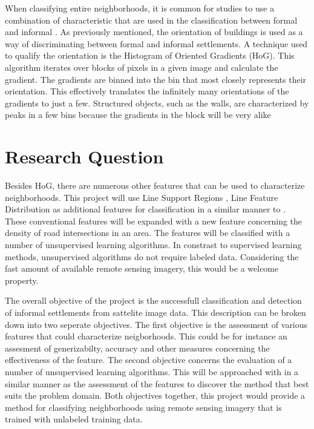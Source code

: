 \documentclass{article}
\begin{document}

When classifying entire neighborhoods, it is common for studies to use a combination
of characteristic that are used in the classification between formal and
informal \cite{graesser2012image}. As previously mentioned, the orientation of
buildings is used as a way of discriminating between formal and informal
settlements. A technique used to qualify the orientation is the Histogram of
Oriented Gradients (HoG)\cite{kumar2006discriminative}. This algorithm iterates over blocks of pixels in a given
image and calculate the gradient. The gradients are binned into
the bin that most closely represents their orientation. This effectively
translates the infinitely many orientations of the gradients to just a few.
Structured objects, such as the walls, are characterized by peaks in a few
bins because the gradients in the block will be very alike






\section{Research Question}

Besides HoG, there are numerous other features that can be used to characterize
neighborhoods. This project will use Line Support Regions \cite{}, Line Feature
Distribution \cite{} as additional features for classification in a similar manner
to \cite{graesser2012image}. These conventional features will be expanded with
a new feature concerning the density of road intersections in an area. The
features will be classified with a number of unsupervised learning algorithms.
In constrast to supervised learning methods, unsupervised algorithms do not
require labeled data. Considering the fast amount of available remote sensing
imagery, this would be a welcome property.

The overall objective of the project is the successfull classification and
detection of informal settlements from sattelite image data. This description
can be broken down into two seperate objectives. The first objective is the
assessment of various features that could characterize neigborhoods. This could
be for instance an assesment of generizabilty, accuracy and other measures
concerning the effectiveness of the feature. The second objective concerns the
evaluation of a number of unsupervised learning algorithms. This will be
approached with in a similar manner as the assessment of the features to
discover the method that best suits the problem domain. Both objectives
together, this project would provide a method for classifying neighborhoods
using remote sensing imagery that is trained with unlabeled training data.
\end{document}
